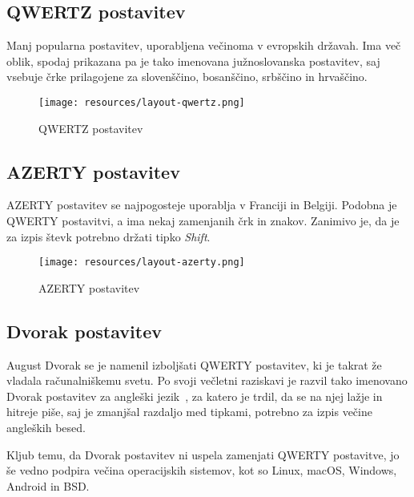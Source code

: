   \subsection{QWERTZ postavitev}\label{subsec:qwertz}

  Manj popularna postavitev, uporabljena večinoma v evropskih državah.
  Ima več oblik, spodaj prikazana pa je tako imenovana južnoslovanska postavitev,
  saj vsebuje črke prilagojene za slovenščino, bosanščino, srbščino in hrvaščino.

  \begin{figure}[h]
    \begin{center}
      \texttt{[image: resources/layout-qwertz.png]}
      \caption{QWERTZ postavitev}
    \end{center}
  \end{figure}

  \newpage

  \subsection{AZERTY postavitev}\label{subsec:azerty}

  AZERTY postavitev se najpogosteje uporablja v Franciji in Belgiji.
  Podobna je QWERTY postavitvi, a ima nekaj zamenjanih črk in znakov.
  Zanimivo je, da je za izpis števk potrebno držati tipko \emph{Shift}. \\

  \begin{figure}[h]
    \begin{center}
      \texttt{[image: resources/layout-azerty.png]}
      \caption{AZERTY postavitev}
    \end{center}
  \end{figure}

  \subsection{Dvorak postavitev}\label{subsec:dvorak}

  August Dvorak se je namenil izboljšati QWERTY postavitev, ki je takrat že vladala računalniškemu svetu.
  Po svoji večletni raziskavi je razvil tako imenovano Dvorak postavitev za angleški jezik~\cite{typewriting_behaviour},
  za katero je trdil, da se na njej lažje in hitreje piše,
  saj je zmanjšal razdaljo med tipkami, potrebno za izpis večine angleških besed.

  Kljub temu, da Dvorak postavitev ni uspela zamenjati QWERTY postavitve,
  jo še vedno podpira večina operacijskih sistemov, kot so Linux, macOS, Windows, Android in BSD\@. \\

